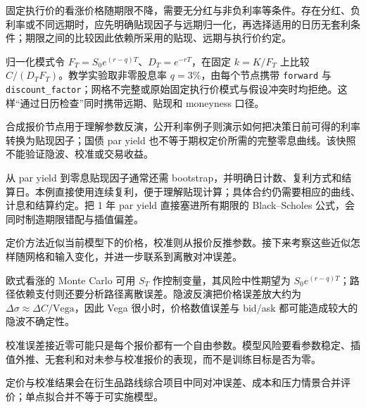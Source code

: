 固定执行价的看涨价格随期限不降，需要无分红与非负利率等条件。存在分红、负利率或不同远期时，应先明确贴现因子与远期归一化，再选择适用的日历无套利条件；期限之间的比较因此依赖所采用的贴现、远期与执行价约定。

归一化模式令 $F_T=S_0e^{(r-q)T}$、$D_T=e^{-rT}$，在固定
$k=K/F_T$ 上比较 $C/(D_TF_T)$。教学实验取非零股息率 $q=3\%$，由每个节点携带
\texttt{forward} 与 \texttt{discount\_factor}；网格不完整或原始固定执行价模式与假设冲突时均拒绝。这样“通过日历检查”同时携带远期、贴现和 moneyness 口径。


合成报价节点用于理解参数反演，公开利率例子则演示如何把决策日前可得的利率转换为贴现因子；国债 par yield 也不等于期权定价所需的完整零息曲线。该快照不能验证隐波、校准或交易收益。

从 par yield 到零息贴现因子通常还需 bootstrap，并明确日计数、复利方式和结算日。本例直接使用连续复利，便于理解贴现计算；具体合约仍需要相应的曲线、计息和结算约定。把 1 年 par yield 直接塞进所有期限的 Black--Scholes 公式，会同时制造期限错配与插值偏差。

定价方法近似当前模型下的价格，校准则从报价反推参数。接下来考察这些近似怎样随网格和输入变化，并进一步联系到离散对冲误差。

欧式看涨的 Monte Carlo 可用 $S_T$ 作控制变量，其风险中性期望为 $S_0e^{(r-q)T}$；路径依赖支付则还要分析路径离散误差。隐波反演把价格误差放大约为 $\Delta\sigma\approx\Delta C/\mathrm{Vega}$，因此 Vega 很小时，价格数值误差与 bid/ask 都可能造成较大的隐波不确定性。

\begin{diagnostic}
校准误差接近零可能只是每个报价都有一个自由参数。模型风险要看参数稳定、插值外推、无套利和对未参与校准报价的表现，而不是训练目标是否为零。
\end{diagnostic}

定价与校准结果会在衍生品路线综合项目中同对冲误差、成本和压力情景合并评价；单点拟合并不等于可实施模型。
